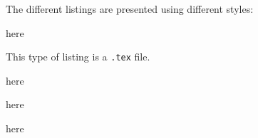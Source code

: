 The different listings are presented using different styles:

\begin{minipage}{.4\linewidth}
 here
\end{minipage}%
\hfill
\begin{minipage}{.4\linewidth}
 This type of listing is a \texttt{.tex} file.
\end{minipage}%

\begin{minipage}{.4\linewidth}
 here
\end{minipage}%
\hfill
\begin{minipage}{.4\linewidth}
 here
\end{minipage}%

\begin{minipage}{.6\linewidth}
 here
\end{minipage}%
